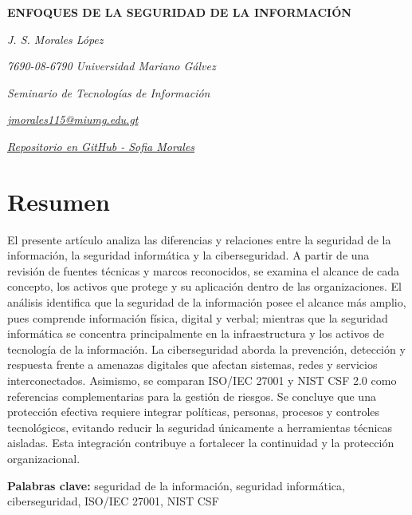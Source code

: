 \documentclass[12pt]{article}
\author{Jenny Sofía Morales}
\begin{document}
	
	\begin{center}
		
		{\bfseries\fontsize{12}{14}\selectfont
			ENFOQUES DE LA SEGURIDAD DE LA INFORMACIÓN
		}
		
		\vspace{0.4cm}
		
		{\itshape J. S. Morales López}
		
		\vspace{0.2cm}
		
		{\itshape 7690-08-6790 Universidad Mariano Gálvez}
		
		{\itshape Seminario de Tecnologías de Información}
		
		{\itshape
			\href{mailto:jmorales115@miumg.edu.gt}{jmorales115@miumg.edu.gt}
		}
		
		{\itshape
			\href{https://github.com/sofiaMorales3805/ForoAcademico-Seminario}{Repositorio en GitHub - Sofia Morales}
		}
	\end{center}
	\vspace{0.5cm}
	
	\section*{Resumen}
	
	El presente artículo analiza las diferencias y relaciones entre la seguridad de la información, la seguridad informática y la ciberseguridad. A partir de una revisión de fuentes técnicas y marcos reconocidos, se examina el alcance de cada concepto, los activos que protege y su aplicación dentro de las organizaciones. El análisis identifica que la seguridad de la información posee el alcance más amplio, pues comprende información física, digital y verbal; mientras que la seguridad informática se concentra principalmente en la infraestructura y los activos de tecnología de la información. La ciberseguridad aborda la prevención, detección y respuesta frente a amenazas digitales que afectan sistemas, redes y servicios interconectados. Asimismo, se comparan ISO/IEC 27001 y NIST CSF 2.0 como referencias complementarias para la gestión de riesgos. Se concluye que una protección efectiva requiere integrar políticas, personas, procesos y controles tecnológicos, evitando reducir la seguridad únicamente a herramientas técnicas aisladas. Esta integración contribuye a fortalecer la continuidad y la protección organizacional.
	
	\textbf{Palabras clave:} seguridad de la información, seguridad informática, ciberseguridad, ISO/IEC 27001, NIST CSF
	
\end{document}
